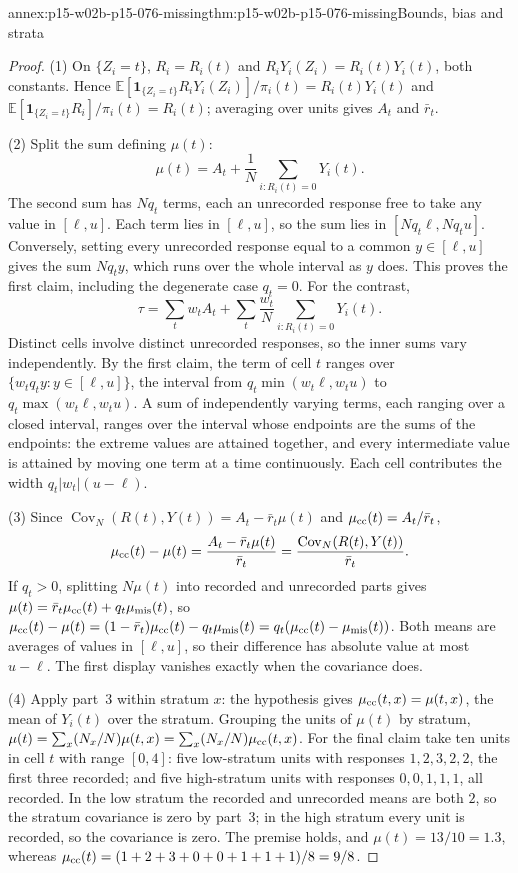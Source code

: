 \begin{annexitem}{annex:p15-w02b-p15-076-missing}{thm:p15-w02b-p15-076-missing}{Bounds, bias and strata}
\begin{proof}
(1) On \(\{Z_i=t\}\), \(R_i=R_i(t)\) and
\(R_iY_i(Z_i)=R_i(t)Y_i(t)\), both constants. Hence
\(\mathbb E[\mathbf 1_{\{Z_i=t\}}R_iY_i(Z_i)]/\pi_i(t)=R_i(t)Y_i(t)\) and
\(\mathbb E[\mathbf 1_{\{Z_i=t\}}R_i]/\pi_i(t)=R_i(t)\); averaging over
units gives \(A_t\) and \(\bar r_t\).

(2) Split the sum defining \(\mu(t)\):
\[
 \mu(t)=A_t+\frac1N\sum_{i:R_i(t)=0}Y_i(t).
\]
The second sum has \(Nq_t\) terms, each an unrecorded response free to take
any value in \([\ell,u]\). Each term lies in \([\ell,u]\), so the sum lies
in \([Nq_t\ell,Nq_tu]\). Conversely, setting every unrecorded response
equal to a common \(y\in[\ell,u]\) gives the sum \(Nq_ty\), which runs over
the whole interval as \(y\) does. This proves the first claim, including
the degenerate case \(q_t=0\). For the contrast,
\[
 \tau=\sum_tw_tA_t+\sum_t\frac{w_t}{N}\sum_{i:R_i(t)=0}Y_i(t).
\]
Distinct cells involve distinct unrecorded responses, so the inner sums
vary independently. By the first claim, the term of cell \(t\) ranges over
\(\{w_tq_ty:y\in[\ell,u]\}\), the interval from
\(q_t\min(w_t\ell,w_tu)\) to \(q_t\max(w_t\ell,w_tu)\). A sum of
independently varying terms, each ranging over a closed interval, ranges
over the interval whose endpoints are the sums of the endpoints: the
extreme values are attained together, and every intermediate value is
attained by moving one term at a time continuously. Each cell contributes
the width \(q_t|w_t|(u-\ell)\).

(3) Since \(\operatorname{Cov}_N(R(t),Y(t))=A_t-\bar r_t\mu(t)\) and
\(\mu_{\rm cc}(t)=A_t/\bar r_t\),
\[
 \mu_{\rm cc}(t)-\mu(t)=\frac{A_t-\bar r_t\mu(t)}{\bar r_t}
 =\frac{\operatorname{Cov}_N(R(t),Y(t))}{\bar r_t}.
\]
If \(q_t>0\), splitting \(N\mu(t)\) into recorded and unrecorded parts gives
\(\mu(t)=\bar r_t\mu_{\rm cc}(t)+q_t\mu_{\rm mis}(t)\), so
\(\mu_{\rm cc}(t)-\mu(t)=(1-\bar r_t)\mu_{\rm cc}(t)-q_t\mu_{\rm mis}(t)
=q_t(\mu_{\rm cc}(t)-\mu_{\rm mis}(t))\). Both means are averages of values
in \([\ell,u]\), so their difference has absolute value at most
\(u-\ell\). The first display vanishes exactly when the covariance does.

(4) Apply part~3 within stratum \(x\): the hypothesis gives
\(\mu_{\rm cc}(t,x)=\mu(t,x)\), the mean of \(Y_i(t)\) over the stratum.
Grouping the units of \(\mu(t)\) by stratum,
\(\mu(t)=\sum_x(N_x/N)\mu(t,x)=\sum_x(N_x/N)\mu_{\rm cc}(t,x)\).
For the final claim take ten units in cell \(t\) with range \([0,4]\):
five low-stratum units with responses \(1,2,3,2,2\), the first three
recorded; and five high-stratum units with responses \(0,0,1,1,1\), all
recorded. In the low stratum the recorded and unrecorded means are both
\(2\), so the stratum covariance is zero by part~3; in the high stratum
every unit is recorded, so the covariance is zero. The premise holds, and
\(\mu(t)=13/10=1.3\), whereas
\(\mu_{\rm cc}(t)=(1+2+3+0+0+1+1+1)/8=9/8\).
\end{proof}
\end{annexitem}

